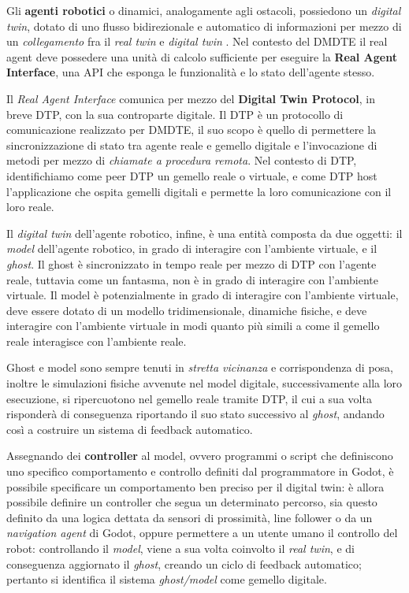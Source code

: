 Gli \textbf{agenti robotici} o dinamici, analogamente agli ostacoli, possiedono un \textit{digital twin}, dotato di uno flusso bidirezionale e automatico di informazioni per mezzo di un \textit{collegamento} fra il \textit{real twin} e \textit{digital twin} \cite{KRITZINGER20181016}. Nel contesto del DMDTE il real agent deve possedere una unità di calcolo sufficiente per eseguire la \textbf{Real Agent Interface}, una API che esponga le funzionalità e lo stato dell'agente stesso.
\medbreak

Il \textit{Real Agent Interface} comunica per mezzo del \textbf{Digital Twin Protocol}, in breve DTP, con la sua controparte digitale. Il DTP è un protocollo di comunicazione realizzato per DMDTE, il suo scopo è quello di permettere la sincronizzazione di stato tra agente reale e gemello digitale e l'invocazione di metodi per mezzo di \textit{chiamate a procedura remota}.
Nel contesto di DTP, identifichiamo come peer DTP un gemello reale o virtuale, e come DTP host l'applicazione che ospita gemelli digitali e permette la loro comunicazione con il loro reale.
\medbreak

Il \textit{digital twin} dell'agente robotico, infine, è una entità composta da due oggetti: il \textit{model} dell'agente robotico, in grado di interagire con l'ambiente virtuale, e il \textit{ghost}. Il ghost è sincronizzato in tempo reale per mezzo di DTP con l'agente reale, tuttavia come un fantasma, non è in grado di interagire con l'ambiente virtuale. Il model è potenzialmente in grado di interagire con l'ambiente virtuale, deve essere dotato di un modello tridimensionale, dinamiche fisiche, e deve interagire con l'ambiente virtuale in modi quanto più simili a come il gemello reale interagisce con l'ambiente reale. 
\medbreak

Ghost e model sono sempre tenuti in \textit{stretta vicinanza} e corrispondenza di posa, inoltre le simulazioni fisiche avvenute nel model digitale, successivamente alla loro esecuzione, si ripercuotono nel gemello reale tramite DTP, il cui a sua volta risponderà di conseguenza riportando il suo stato successivo al \textit{ghost}, andando così a costruire un sistema di feedback automatico.
\medbreak

Assegnando dei \textbf{controller} al model, ovvero programmi o script che definiscono uno specifico comportamento e controllo definiti dal programmatore in Godot, è possibile specificare un comportamento ben preciso per il digital twin: è allora possibile definire un controller che segua un determinato percorso, sia questo definito da una logica dettata da sensori di prossimità, line follower o da un \textit{navigation agent} di Godot, oppure permettere a un utente umano il controllo del robot: controllando il \textit{model}, viene a sua volta coinvolto il \textit{real twin}, e di conseguenza aggiornato il \textit{ghost}, creando un ciclo di feedback automatico; pertanto si identifica il sistema \textit{ghost/model} come gemello digitale.
\medbreak

